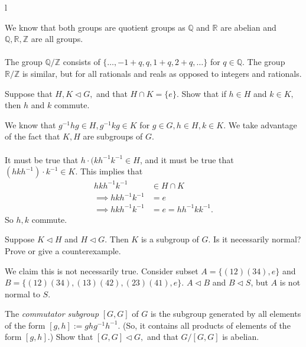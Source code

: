 l\documentclass{scrartcl}
\begin{document}
\begin{soln}
    We know that both groups are quotient groups as $\mathbb{Q}$ and $\mathbb{R}$ are abelian and $\mathbb{Q}, \mathbb{R}, \mathbb{Z}$ are all groups. \\
    \\
    The group $\mathbb{Q} / \mathbb{Z}$ consists of $\{ \dotsc, -1 + q, q, 1 + q, 2 + q, \dotsc \}$ for $q \in \mathbb{Q}$. The group $\mathbb{R} / \mathbb{Z}$ is similar, but for all rationals and reals as opposed to integers and rationals.
\end{soln}

\begin{problem}[3]
    Suppose that $H,K\lhd G,$ and that $H\cap K=\{e\}.$ Show that if $h\in H$ and $k\in K,$ then $h$ and $k$ commute.
\end{problem}
\begin{soln}
    We know that $g^{-1}hg \in H, g^{-1}kg \in K$ for $g \in G, h \in H, k \in K$. We take advantage of the fact that $K, H$ are subgroups of $G$.\\
    \\
    It must be true that $h \cdot (kh^{-1}k^{-1} \in H$, and it must be true that $(hkh^{-1}) \cdot k^{-1} \in K$. This implies that 
    \begin{align*}
        hkh^{-1}k^{-1} &\in H \cap K \\
        \implies hkh^{-1}k^{-1} &= e \\
        \implies hkh^{-1}k^{-1} &= e = hh^{-1}kk^{-1}.
    \end{align*}
    So $h,k$ commute.
\end{soln}

\begin{problem}[5]
    Suppose $K \lhd H$ and $H \lhd G.$ Then $K$ is a subgroup of $G.$ Is it necessarily normal? Prove or give a counterexample.
\end{problem}

\begin{soln}
    We claim this is not necessarily true. Consider subset $A = \{ (12)(34), e \}$ and $B = \{(12)(34), (13)(42), (23)(41), e \}$. $A \lhd B$ and $B \lhd S$, but $A$ is not normal to $S$.
\end{soln}

\begin{problem}[6]
    The \textit{commutator subgroup} $[G, G]$ of $G$ is the subgroup generated by all elements of the form $[g, h] := ghg^{-1}h^{-1}.$ (So, it contains all products of elements of the form $[g, h].$) Show that $[G, G] \lhd G,$ and that $G/[G, G]$ is abelian.
\end{problem}
\end{document}
